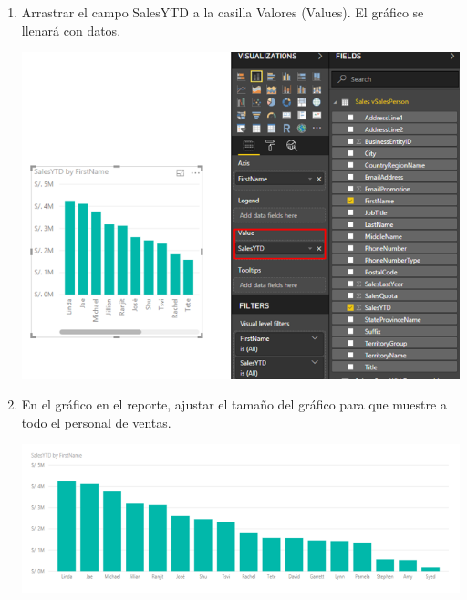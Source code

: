 \begin{itemize}
\begin{enumerate}
\item Arrastrar el campo SalesYTD a la casilla Valores (Values). El gráfico se llenará con datos.
\begin{center}
\includegraphics[scale=0.55]{./Imagenes/3.png}
\end{center}

\item En el gráfico en el reporte, ajustar el tamaño del gráfico para que muestre a todo el personal de ventas.
\begin{center}
\includegraphics[scale=0.55]{./Imagenes/4.png}
\end{center}


\end{enumerate}
\end{itemize}
